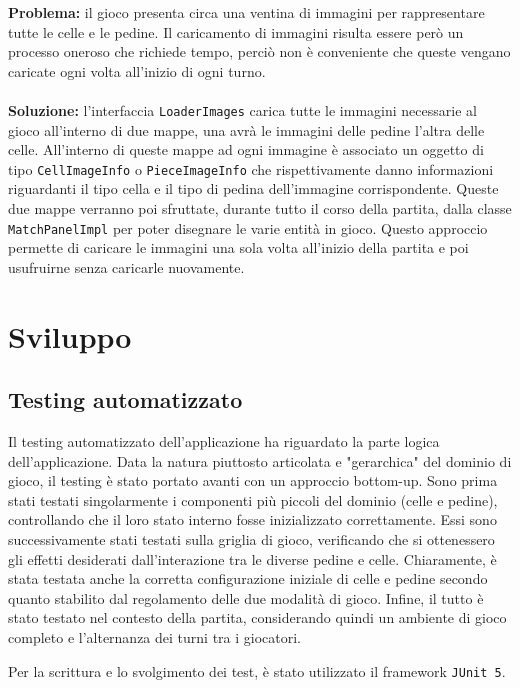 \documentclass[a4paper,12pt]{report}
\begin{document}
\textbf{Problema:} il gioco presenta circa una ventina di immagini per rappresentare tutte le celle e le pedine. Il caricamento di immagini risulta essere però un processo oneroso che richiede tempo, perciò non è conveniente che queste vengano caricate ogni volta all'inizio di ogni turno. 
\\\\
\textbf{Soluzione:}  l'interfaccia \texttt{LoaderImages} carica tutte le immagini necessarie al gioco all’interno di due mappe, una avrà le immagini delle pedine l’altra delle celle. All’interno di queste mappe ad ogni immagine è associato un oggetto di tipo \texttt{CellImageInfo} o \texttt{PieceImageInfo} che rispettivamente danno informazioni riguardanti il tipo cella e il tipo di pedina dell’immagine corrispondente.
Queste due mappe verranno poi sfruttate, durante tutto il corso della partita, dalla classe \texttt{MatchPanelImpl} per poter disegnare le varie entità in gioco. Questo approccio permette di caricare le immagini una sola volta all'inizio della partita e poi usufruirne  senza caricarle nuovamente. 



\chapter{Sviluppo}


\section{Testing automatizzato}

Il testing automatizzato dell'applicazione ha riguardato la parte logica dell'applicazione. Data la natura piuttosto articolata e "gerarchica" del dominio di gioco, il testing è stato portato avanti con un approccio bottom-up. Sono prima stati testati singolarmente i componenti più piccoli del dominio (celle e pedine), controllando che il loro stato interno fosse inizializzato correttamente. Essi sono successivamente stati testati sulla griglia di gioco, verificando che si ottenessero gli effetti desiderati dall'interazione tra le diverse pedine e celle. Chiaramente, è stata testata anche la corretta configurazione iniziale di celle e pedine secondo quanto stabilito dal regolamento delle due modalità di gioco. Infine, il tutto è stato testato nel contesto della partita, considerando quindi un ambiente di gioco completo e l'alternanza dei turni tra i giocatori.

Per la scrittura e lo svolgimento dei test, è stato utilizzato il framework \texttt{JUnit 5}.
\end{document}
